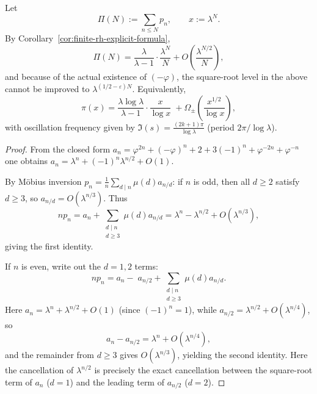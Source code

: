 \begin{corollary}\label{cor:finite-rh-prime-orbit-osc}
Let
\[
\Pi(N):=\sum_{n\le N}p_n,\qquad x:=\lambda^N.
\]
By Corollary~\ref{cor:finite-rh-explicit-formula},
\[
\Pi(N)=\frac{\lambda}{\lambda-1}\cdot\frac{\lambda^N}{N}+O\!\left(\frac{\lambda^{N/2}}{N}\right),
\]
and because of the actual existence of $(-\varphi)$, the square-root level in the above cannot be improved to $\lambda^{(1/2-\varepsilon)N}$. Equivalently,
\[
\pi(x)=\frac{\lambda\log\lambda}{\lambda-1}\cdot\frac{x}{\log x}
\;+\Omega_{\pm}\!\left(\frac{x^{1/2}}{\log x}\right),
\]
with oscillation frequency given by $\Im(s)=\frac{(2k+1)\pi}{\log\lambda}$ (period $2\pi/\log\lambda$).
\end{corollary}

\begin{proof}
From the closed form
\(
a_n=\varphi^{2n}+(-\varphi)^n+2+3(-1)^n+\varphi^{-2n}+\varphi^{-n}
\)
one obtains
\(
a_n=\lambda^n+(-1)^n\lambda^{n/2}+O(1)
\).

By M\"obius inversion $p_n=\frac1n\sum_{d\mid n}\mu(d)a_{n/d}$:
if $n$ is odd, then all $d\ge 2$ satisfy $d\ge 3$, so $a_{n/d}=O(\lambda^{n/3})$. Thus
\[
np_n=a_n+\sum_{\substack{d\mid n\\ d\ge 3}}\mu(d)a_{n/d}
=\lambda^n-\lambda^{n/2}+O(\lambda^{n/3}),
\]
giving the first identity.

If $n$ is even, write out the $d=1,2$ terms:
\[
np_n=a_n-\;a_{n/2}+\sum_{\substack{d\mid n\\ d\ge 3}}\mu(d)a_{n/d}.
\]
Here $a_n=\lambda^n+\lambda^{n/2}+O(1)$ (since $(-1)^n=1$), while $a_{n/2}=\lambda^{n/2}+O(\lambda^{n/4})$, so
\[
a_n-a_{n/2}=\lambda^n+O(\lambda^{n/4}),
\]
and the remainder from $d\ge 3$ gives $O(\lambda^{n/3})$, yielding the second identity. Here the cancellation of $\lambda^{n/2}$ is precisely the exact cancellation between the square-root term of $a_n$ ($d=1$) and the leading term of $a_{n/2}$ ($d=2$).
\end{proof}
